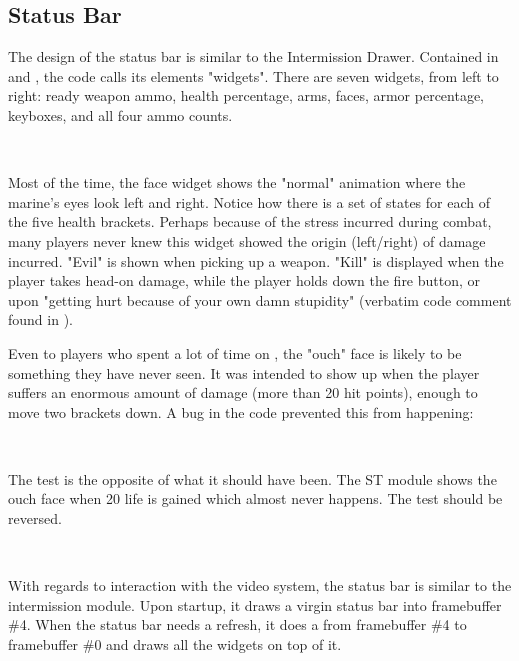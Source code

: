 \subsection{Status Bar}
The design of the status bar is similar to the Intermission Drawer. Contained in  and , the code calls its elements "widgets". There are seven widgets, from left to right: ready weapon ammo, health percentage, arms, faces, armor percentage, keyboxes, and all four ammo counts.\\
\par
{}
\par

\par
{}\\
\par
Most of the time, the face widget shows the "normal" animation where the marine's eyes look left and right. Notice how there is a set of states for each of the five health brackets. Perhaps because of the stress incurred during combat, many players never knew this widget showed the origin (left/right) of damage incurred. "Evil" is shown when picking up a weapon. "Kill" is displayed when the player takes head-on damage, while the player holds down the fire button, or upon "getting hurt because of your own damn stupidity" (verbatim code comment found in ).\\
\par
Even to players who spent a lot of time on \doom, the "ouch" face is likely to be something they have never seen. It was intended to show up when the player suffers an enormous amount of damage (more than 20 hit points), enough to move two brackets down. A bug in the code prevented this from happening:\\
\par
{}\\
\par
The test is the opposite of what it should have been. The ST module shows the ouch face when 20 life is gained which almost never happens. The test should be reversed.\\
\par
{}\\
\par
With regards to interaction with the video system, the status bar is similar to the intermission module. Upon startup, it draws a virgin status bar into framebuffer \#4. When the status bar needs a refresh, it does a  from framebuffer \#4 to framebuffer \#0 and draws all the widgets on top of it.\\
\par
{}



